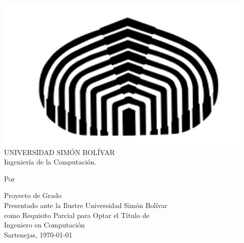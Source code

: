 \begin{titlepage}
\vspace{2cm}
\begin{Large}
	\begin{center}
		\includegraphics{imagenes/cebolla.png} \\
		UNIVERSIDAD SIMÓN BOLÍVAR \\
		Ingeniería de la Computación.
	\end{center}
\end{Large}
\vspace{2cm}
\begin{Large}
	\begin{center}
		\textbf{\titulo}
	\end{center}
\end{Large}
\vspace{1cm}
\begin{large}
	\begin{center}
		Por \\
		\autores
	\end{center}
\end{large}
\vspace{2cm}
\begin{large}
	\begin{center}
		Proyecto de Grado  \\ 
		Presentado ante la Ilustre Universidad Simón Bolívar \\
		como Requisito Parcial para Optar el Título de \\
		Ingeniero en Computación \\
		\vspace{1cm}
		Sartenejas, \today
	\end{center}
\end{large}
\end{titlepage}